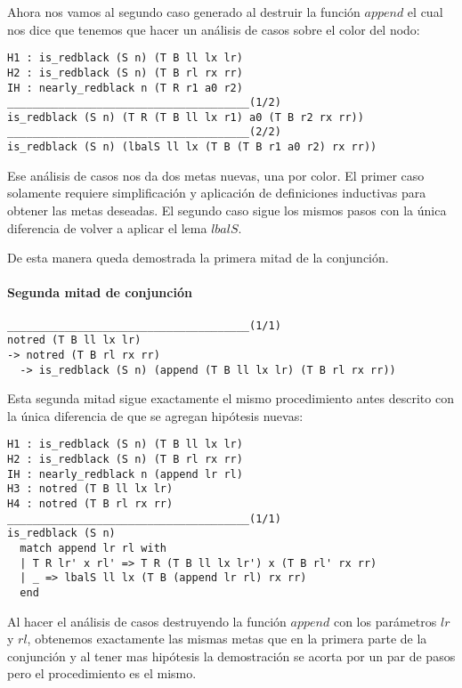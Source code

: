 Ahora nos vamos al segundo caso generado al destruir la funci\'on \hyperref[func_app]{$append$} el 
cual nos dice que tenemos que hacer un análisis de casos sobre el color del nodo:

\begin{verbatim}
H1 : is_redblack (S n) (T B ll lx lr)
H2 : is_redblack (S n) (T B rl rx rr)
IH : nearly_redblack n (T R r1 a0 r2)
______________________________________(1/2)
is_redblack (S n) (T R (T B ll lx r1) a0 (T B r2 rx rr))
______________________________________(2/2)
is_redblack (S n) (lbalS ll lx (T B (T B r1 a0 r2) rx rr))
\end{verbatim}

Ese análisis de casos nos da dos metas nuevas, una por color. El primer caso solamente requiere
simplificaci\'on y aplicaci\'on de definiciones inductivas para obtener las metas deseadas. El
segundo caso sigue los mismos pasos con la única diferencia de volver a aplicar el lema 
\hyperref[lbalS]{$lbalS$}.

De esta manera queda demostrada la primera mitad de la conjunci\'on.

\paragraph{Segunda mitad de conjunci\'on}

\begin{verbatim}
______________________________________(1/1)
notred (T B ll lx lr)
-> notred (T B rl rx rr)
  -> is_redblack (S n) (append (T B ll lx lr) (T B rl rx rr))
\end{verbatim}

Esta segunda mitad sigue exactamente el mismo procedimiento antes descrito con la \'unica
diferencia de que se agregan hip\'otesis nuevas:

\begin{verbatim}
H1 : is_redblack (S n) (T B ll lx lr)
H2 : is_redblack (S n) (T B rl rx rr)
IH : nearly_redblack n (append lr rl)
H3 : notred (T B ll lx lr)
H4 : notred (T B rl rx rr)
______________________________________(1/1)
is_redblack (S n)
  match append lr rl with
  | T R lr' x rl' => T R (T B ll lx lr') x (T B rl' rx rr)
  | _ => lbalS ll lx (T B (append lr rl) rx rr)
  end
\end{verbatim}

Al hacer el análisis de casos destruyendo la funci\'on \hyperref[func_app]{$append$} con los 
par\'ametros $lr$ y $rl$, obtenemos exactamente las mismas metas que en la primera parte de la 
conjunci\'on y al tener mas hipótesis la demostraci\'on se acorta por un par de pasos pero el 
procedimiento es el mismo.

